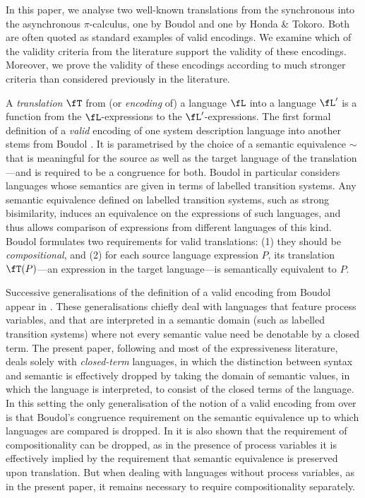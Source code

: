 \documentclass[runningheads]{llncs}
\begin{document}
In this paper, we analyse two well-known translations from the synchronous into the asynchronous
$\pi$-calculus, one by Boudol and one by Honda \& Tokoro. Both are often quoted as standard examples of
valid encodings. We examine which of the validity criteria from the literature support the validity
of these encodings. Moreover, we prove the validity of these encodings according to much stronger
criteria than considered previously in the literature.
\pagebreak[3]

A \emph{translation} $\fT$ from (or \emph{encoding} of) a language $\fL$ into a language $\fL'$ is a
function from the $\fL$-expressions to the $\fL'$-expressions. The first formal definition of
a \emph{valid} encoding of one system description language into another stems from Boudol
\cite{Bo85}. It is parametrised by the choice of a semantic equivalence $\sim$ that is meaningful for the
source as well as the target language of the translation---and is required to be a congruence for
both. Boudol in particular considers languages whose semantics are given in terms of labelled
transition systems. Any semantic equivalence defined on labelled transition systems, such as
strong bisimilarity, induces an equivalence on the expressions of such languages, and thus allows
comparison of expressions from different languages of this kind. Boudol formulates two requirements
for valid translations: (1) they should be \emph{compositional}, and (2) for each source language expression $P$,
its translation $\fT(P)$---an expression in the target language---is semantically equivalent to $P$.
\advance\textheight 1pt

\advance\textheight -1pt
Successive generalisations of the definition of a valid encoding from Boudol \cite{Bo85} appear in \cite{vG94a,vG12,vG18b}.
These generalisations chiefly deal with languages that feature process variables, and that are
interpreted in a semantic domain (such as labelled transition systems) where not every semantic value
need be denotable by a closed term. The present paper, following \cite{Bo85} and most of the
expressiveness literature, deals solely with \emph{closed-term} languages,
in which the distinction between syntax and semantic is effectively dropped by taking the domain of
semantic values, in which the language is interpreted, to consist of the closed terms of the language.
In this setting the only generalisation of the notion of a valid encoding from
\cite{vG94a,vG12,vG18b} over \cite{Bo85} is that Boudol's congruence requirement on the semantic equivalence 
up to which languages are compared is dropped. In \cite{vG18b} it is also shown that the requirement of
compositionality can be dropped, as in the presence of process variables it is effectively implied
by the requirement that semantic equivalence is preserved upon translation. But when dealing with
languages without process variables, as in the present paper, it remains necessary to require
compositionality separately.
\end{document}
